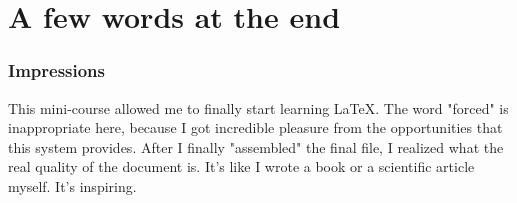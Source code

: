 \documentclass{beamer}
\begin{document}

\section{A few words at the end}



\begin{frame}
\frametitle{Impressions}

This mini-course allowed me to finally start learning LaTeX. The word "forced" is inappropriate here, because I got incredible pleasure from the opportunities that this system provides. After I finally "assembled" the final file, I realized what the real quality of the document is. It's like I wrote a book or a scientific article myself. It's inspiring.

\end{frame}

\end{document}
